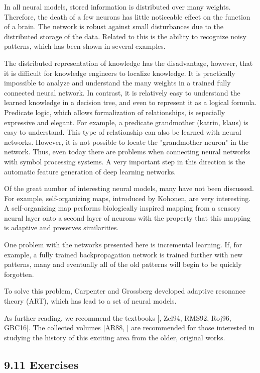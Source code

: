 \documentclass[10pt]{article}
\begin{document}
In all neural models, stored information is distributed over many weights. Therefore, the death of a few neurons has little noticeable effect on the function of a brain. The network is robust against small disturbances due to the distributed storage of the data. Related to this is the ability to recognize noisy patterns, which has been shown in several examples.

The distributed representation of knowledge has the disadvantage, however, that it is difficult for knowledge engineers to localize knowledge. It is practically impossible to analyze and understand the many weights in a trained fully connected neural network. In contrast, it is relatively easy to understand the learned knowledge in a decision tree, and even to represent it as a logical formula. Predicate logic, which allows formalization of relationships, is especially expressive and elegant. For example, a predicate grandmother (katrin, klaus) is easy to understand. This type of relationship can also be learned with neural networks. However, it is not possible to locate the "grandmother neuron" in the network. Thus, even today there are problems when connecting neural networks with symbol processing systems. A very important step in this direction is the automatic feature generation of deep learning networks.

Of the great number of interesting neural models, many have not been discussed. For example, self-organizing maps, introduced by Kohonen, are very interesting. A self-organizing map performs biologically inspired mapping from a sensory neural layer onto a second layer of neurons with the property that this mapping is adaptive and preserves similarities.

One problem with the networks presented here is incremental learning. If, for example, a fully trained backpropagation network is trained further with new patterns, many and eventually all of the old patterns will begin to be quickly forgotten.

To solve this problem, Carpenter and Grossberg developed adaptive resonance theory (ART), which has lead to a set of neural models.


As further reading, we recommend the textbooks [\cite{bishop2005nnpr}, Zel94, RMS92, Roj96, GBC16]. The collected volumes [AR88, \cite{anderson1990neurocomputingv2}] are recommended for those interested in studying the history of this exciting area from the older, original works.

\subsection*{9.11 Exercises}
\end{document}
